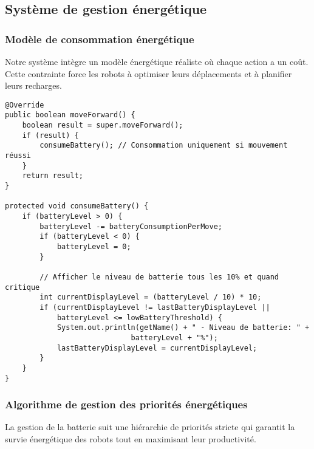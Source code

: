 \documentclass[12pt,a4paper]{article}
\begin{document}
\subsection{Système de gestion énergétique}

\subsubsection{Modèle de consommation énergétique}

Notre système intègre un modèle énergétique réaliste où chaque action a un coût. Cette contrainte force les robots à optimiser leurs déplacements et à planifier leurs recharges.

\begin{lstlisting}[caption=Consommation de batterie lors des mouvements]
@Override
public boolean moveForward() {
    boolean result = super.moveForward();
    if (result) {
        consumeBattery(); // Consommation uniquement si mouvement réussi
    }
    return result;
}

protected void consumeBattery() {
    if (batteryLevel > 0) {
        batteryLevel -= batteryConsumptionPerMove;
        if (batteryLevel < 0) {
            batteryLevel = 0;
        }

        // Afficher le niveau de batterie tous les 10% et quand critique
        int currentDisplayLevel = (batteryLevel / 10) * 10;
        if (currentDisplayLevel != lastBatteryDisplayLevel ||
            batteryLevel <= lowBatteryThreshold) {
            System.out.println(getName() + " - Niveau de batterie: " +
                             batteryLevel + "%");
            lastBatteryDisplayLevel = currentDisplayLevel;
        }
    }
}
\end{lstlisting}

\subsubsection{Algorithme de gestion des priorités énergétiques}

La gestion de la batterie suit une hiérarchie de priorités stricte qui garantit la survie énergétique des robots tout en maximisant leur productivité.
\end{document}
